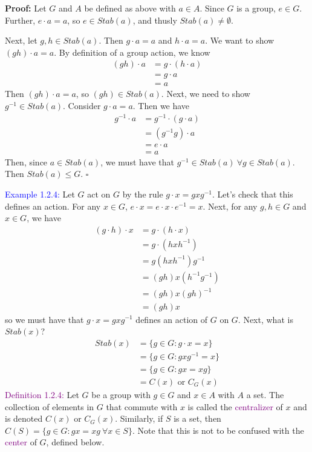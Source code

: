 \documentclass{article}
\begin{document}
\textbf{Proof:} Let $G$ and $A$ be defined as above with $a \in A$. Since $G$ is a group, $e \in G$. Further, $e \cdot a = a$, so 
$e \in Stab(a)$, and thusly $Stab(a) \neq \emptyset$. 

Next, let $g,h \in Stab(a)$. Then $g \cdot a = a$ and $h \cdot a = a$. We want to show $(gh) \cdot a = a$. By definition of a group 
action, we know
\begin{align*}
    (gh) \cdot a &= g \cdot (h \cdot a) \\
    &= g \cdot a \\
    &= a
\end{align*}
Then $(gh) \cdot a = a$, so $(gh) \in Stab(a)$. Next, we need to show $g^{-1} \in Stab(a)$. Consider $g \cdot a = a$. Then we have
\begin{align*}
    g^{-1} \cdot a &=  g^{-1} \cdot (g \cdot a)\\
    &= (g^{-1}g) \cdot a \\
    &=e \cdot a \\
    &= a
\end{align*}
Then, since $a \in Stab(a)$, we must have that $g^{-1} \in Stab(a) \ \forall g \in Stab(a)$. Then $Stab(a) \leq G$. $\square$

\textcolor{blue}{Example 1.2.4:} Let $G$ act on $G$ by the rule $g \cdot x = gxg^{-1}$. Let's check that this defines an action. For any 
$x \in G$, $e \cdot x = e \cdot x \cdot e^{-1} = x$. Next, for any $g,h \in G$ and $x \in G$, we have
\begin{align*}
    (g \cdot h) \cdot x &= g \cdot (h \cdot x)  \\
    &= g \cdot (hxh^{-1}) \\
    &= g(hxh^{-1})g^{-1} \\
    &= (gh)x(h^{-1}g^{-1}) \\
    &= (gh)x(gh)^{-1} \\
    &= (gh)x 
\end{align*}
so we must have that $g \cdot x = gxg^{-1}$ defines an action of $G$ on $G$. Next, what is $Stab(x)$?
\begin{align*}
    Stab(x) &= \{ g \in G: g \cdot x = x\} \\
    &= \{ g \in G: gxg^{-1} = x\} \\
    &= \{ g \in G: gx = xg\} \\
    &= C(x) \text{ or } C_G(x)
\end{align*}
\textcolor{purple}{Definition 1.2.4:} Let $G$ be a group with $g \in G$ and $x \in A$ with $A$ a set. The collection of elements in $G$ 
that commute with $x$ is called the \textcolor{purple}{centralizer} of $x$ and is denoted $C(x)$ or $C_G(x)$. Similarly, if $S$ is a set, 
then $C(S) = \{ g \in G: gx = xg \ \forall x \in S\}$. Note that this is not to be confused with the \textcolor{purple}{center} of $G$, 
defined below.
\end{document}
